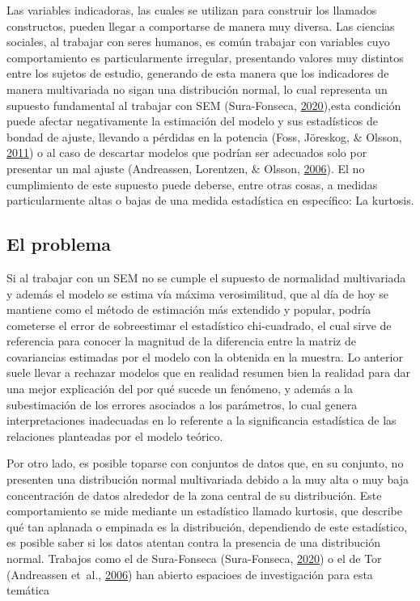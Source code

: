 \documentclass[
  english]{revcoles}
\begin{document}
Las variables indicadoras, las cuales se utilizan para construir los
llamados constructos, pueden llegar a comportarse de manera muy diversa.
Las ciencias sociales, al trabajar con seres humanos, es común trabajar
con variables cuyo comportamiento es particularmente irregular,
presentando valores muy distintos entre los sujetos de estudio,
generando de esta manera que los indicadores de manera multivariada no
sigan una distribución normal, lo cual representa un supuesto
fundamental al trabajar con SEM (Sura-Fonseca,
\protect\hyperlink{ref-sura}{2020}),esta condición puede afectar
negativamente la estimación del modelo y sus estadísticos de bondad de
ajuste, llevando a pérdidas en la potencia (Foss, Jöreskog, \& Olsson,
\protect\hyperlink{ref-foss}{2011}) o al caso de descartar modelos que
podrían ser adecuados solo por presentar un mal ajuste (Andreassen,
Lorentzen, \& Olsson, \protect\hyperlink{ref-andreassen}{2006}). El no
cumplimiento de este supuesto puede deberse, entre otras cosas, a
medidas particularmente altas o bajas de una medida estadística en
específico: La kurtosis.

\subsection{El problema}

Si al trabajar con un SEM no se cumple el supuesto de normalidad
multivariada y además el modelo se estima vía máxima verosimilitud, que
al día de hoy se mantiene como el método de estimación más extendido y
popular, podría cometerse el error de sobreestimar el estadístico
chi-cuadrado, el cual sirve de referencia para conocer la magnitud de la
diferencia entre la matriz de covariancias estimadas por el modelo con
la obtenida en la muestra. Lo anterior suele llevar a rechazar modelos
que en realidad resumen bien la realidad para dar una mejor explicación
del por qué sucede un fenómeno, y además a la subestimación de los
errores asociados a los parámetros, lo cual genera interpretaciones
inadecuadas en lo referente a la significancia estadística de las
relaciones planteadas por el modelo teórico.

Por otro lado, es posible toparse con conjuntos de datos que, en su
conjunto, no presenten una distribución normal multivariada debido a la
muy alta o muy baja concentración de datos alrededor de la zona central
de su distribución. Este comportamiento se mide mediante un estadístico
llamado kurtosis, que describe qué tan aplanada o empinada es la
distribución, dependiendo de este estadístico, es posible saber si los
datos atentan contra la presencia de una distribución normal. Trabajos
como el de Sura-Fonseca (Sura-Fonseca,
\protect\hyperlink{ref-sura}{2020}) o el de Tor (Andreassen et~al.,
\protect\hyperlink{ref-andreassen}{2006}) han abierto espacioes de
investigación para esta temática
\end{document}

